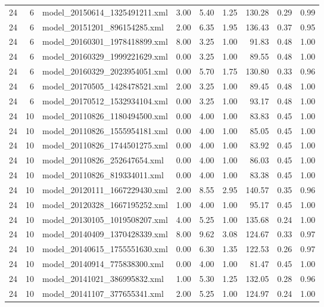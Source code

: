 \begin{table}[ht]
\begin{tabular}{rrlrrrrrr}
   24 &   6 & model\_20150614\_1325491211.xml & 3.00 & 5.40 & 1.25 & 130.28 & 0.29 & 0.99 \\ 
   24 &   6 & model\_20151201\_896154285.xml & 2.00 & 6.35 & 1.95 & 136.43 & 0.37 & 0.95 \\ 
   24 &   6 & model\_20160301\_1978418899.xml & 8.00 & 3.25 & 1.00 & 91.83 & 0.48 & 1.00 \\ 
   24 &   6 & model\_20160329\_1999221629.xml & 0.00 & 3.25 & 1.00 & 89.55 & 0.48 & 1.00 \\ 
   24 &   6 & model\_20160329\_2023954051.xml & 0.00 & 5.70 & 1.75 & 130.80 & 0.33 & 0.96 \\ 
   24 &   6 & model\_20170505\_1428478521.xml & 2.00 & 3.25 & 1.00 & 89.45 & 0.48 & 1.00 \\ 
   24 &   6 & model\_20170512\_1532934104.xml & 0.00 & 3.25 & 1.00 & 93.17 & 0.48 & 1.00 \\ 
   24 &  10 & model\_20110826\_1180494500.xml & 0.00 & 4.00 & 1.00 & 83.83 & 0.45 & 1.00 \\ 
   24 &  10 & model\_20110826\_1555954181.xml & 0.00 & 4.00 & 1.00 & 85.05 & 0.45 & 1.00 \\ 
   24 &  10 & model\_20110826\_1744501275.xml & 0.00 & 4.00 & 1.00 & 83.92 & 0.45 & 1.00 \\ 
   24 &  10 & model\_20110826\_252647654.xml & 0.00 & 4.00 & 1.00 & 86.03 & 0.45 & 1.00 \\ 
   24 &  10 & model\_20110826\_819334011.xml & 0.00 & 4.00 & 1.00 & 83.38 & 0.45 & 1.00 \\ 
   24 &  10 & model\_20120111\_1667229430.xml & 2.00 & 8.55 & 2.95 & 140.57 & 0.35 & 0.96 \\ 
   24 &  10 & model\_20120328\_1667195252.xml & 1.00 & 4.00 & 1.00 & 95.17 & 0.45 & 1.00 \\ 
   24 &  10 & model\_20130105\_1019508207.xml & 4.00 & 5.25 & 1.00 & 135.68 & 0.24 & 1.00 \\ 
   24 &  10 & model\_20140409\_1370428339.xml & 8.00 & 9.62 & 3.08 & 124.67 & 0.33 & 0.97 \\ 
   24 &  10 & model\_20140615\_1755551630.xml & 0.00 & 6.30 & 1.35 & 122.53 & 0.26 & 0.97 \\ 
   24 &  10 & model\_20140914\_775838300.xml & 0.00 & 4.00 & 1.00 & 81.47 & 0.45 & 1.00 \\ 
   24 &  10 & model\_20141021\_386995832.xml & 1.00 & 5.30 & 1.25 & 132.05 & 0.28 & 0.96 \\ 
   24 &  10 & model\_20141107\_377655341.xml & 2.00 & 5.25 & 1.00 & 124.97 & 0.24 & 1.00 \\ 

\end{tabular}
\end{table}
